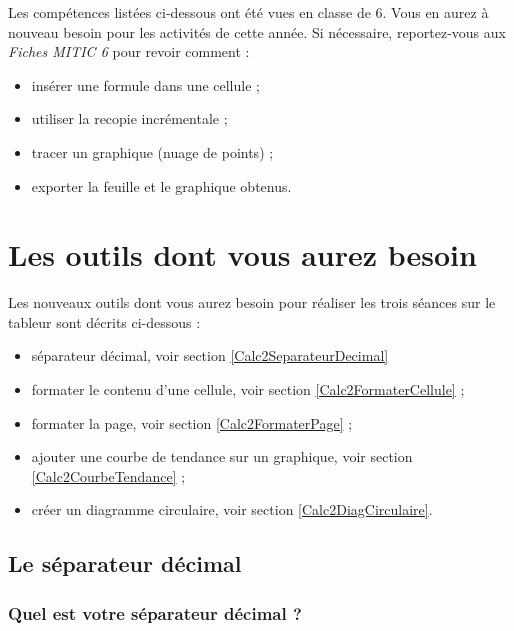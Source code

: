 Les compétences listées ci-dessous ont été vues en classe de 6. Vous en aurez à nouveau besoin pour les activités de cette année. Si nécessaire, reportez-vous aux \emph{Fiches MITIC 6} pour revoir comment :  

\begin{itemize}
\item insérer une formule dans une cellule ;
\item utiliser la recopie incrémentale ;
\item tracer un graphique (nuage de points) ;
\item exporter la feuille et le graphique obtenus.
\end{itemize}


\section{Les outils dont vous aurez besoin}\label{Tableur5eOutils}
 
Les nouveaux outils dont vous aurez besoin pour réaliser les trois séances sur le tableur sont décrits ci-dessous :

\begin{itemize}  
\item séparateur décimal, voir section \vref{Calc2SeparateurDecimal}  
\item formater le contenu d'une cellule, voir section \vref{Calc2FormaterCellule} ;
\item formater la page, voir section \vref{Calc2FormaterPage} ;
\item ajouter une courbe de tendance sur un graphique, voir section \vref{Calc2CourbeTendance} ;
\item créer un diagramme circulaire, voir section \vref{Calc2DiagCirculaire}.
\end{itemize}  

\subsection{Le séparateur décimal}\label{Calc2SeparateurDecimal}



\subsubsection{Quel est votre séparateur décimal ?}


